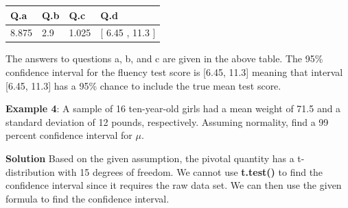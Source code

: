 \documentclass[
]{book}
\newenvironment{Shaded}{\begin{snugshade}}{\end{snugshade}}
\newcommand{\AttributeTok}[1]{\textcolor[rgb]{0.13,0.29,0.53}{#1}}
\newcommand{\CommentTok}[1]{\textcolor[rgb]{0.56,0.35,0.01}{\textit{#1}}}
\newcommand{\DecValTok}[1]{\textcolor[rgb]{0.00,0.00,0.81}{#1}}
\newcommand{\FloatTok}[1]{\textcolor[rgb]{0.00,0.00,0.81}{#1}}
\newcommand{\FunctionTok}[1]{\textcolor[rgb]{0.13,0.29,0.53}{\textbf{#1}}}
\newcommand{\NormalTok}[1]{#1}
\newcommand{\OtherTok}[1]{\textcolor[rgb]{0.56,0.35,0.01}{#1}}
\newcommand{\SpecialCharTok}[1]{\textcolor[rgb]{0.81,0.36,0.00}{\textbf{#1}}}
\newcommand{\StringTok}[1]{\textcolor[rgb]{0.31,0.60,0.02}{#1}}
\begin{document}
\begin{Shaded}
\end{Shaded}

\begin{tabular}{l|l|l|l}
\hline
Q.a & Q.b & Q.c & Q.d\\
\hline
8.875 & 2.9 & 1.025 & [ 6.45 ,  11.3 ]\\
\hline
\end{tabular}

The answers to questions a, b, and c are given in the above table. The 95\% confidence interval for the fluency test score is {[}6.45, 11.3{]} meaning that interval {[}6.45, 11.3{]} has a 95\% chance to include the true mean test score.

\textbf{Example 4}: A sample of 16 ten-year-old girls had a mean weight of 71.5 and a standard deviation of 12 pounds, respectively. Assuming normality, find a 99 percent confidence interval for \(\mu\).

\textbf{Solution} Based on the given assumption, the pivotal quantity has a t-distribution with 15 degrees of freedom. We cannot use \textbf{t.test()} to find the confidence interval since it requires the raw data set. We can then use the given formula to find the confidence interval.
\end{document}
